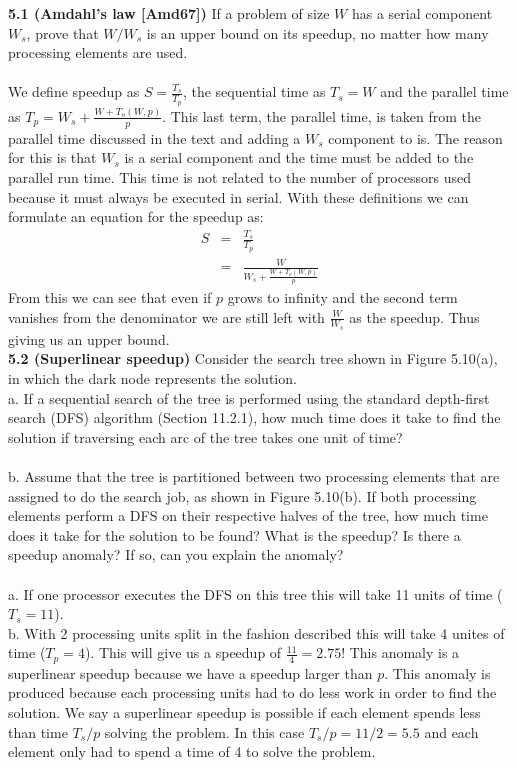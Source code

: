 \documentclass[11pt]{article}
\begin{document}
 {\bf 5.1 (Amdahl's law [Amd67])} If a problem of size $W$ has a serial
 component $W_s$, prove that $W/W_s$ is an upper bound on its speedup, no
 matter how many processing elements are used.\\\\
 We define speedup as $S = \frac{T_s}{T_p}$, the sequential time
 as $T_s = W$ and the parallel time as $T_p = W_s +
 \frac{W+T_o(W,p)}{p}$. This last term, the parallel time, is
 taken from the parallel time discussed in the text and adding a
 $W_s$ component to is. The reason for this is that $W_s$ is a
 serial component and the time must be added to the parallel
 run time. This time is not related to the number of processors
 used because it must always be executed in serial. With these
 definitions we can formulate an equation for the speedup as:
 $$ \begin{array}{lcc}
   S & = & \frac{T_s}{T_p}\\
   & = & \frac{W}{W_s + \frac{W+T_o(W,p)}{p}}
 \end{array} $$
 From this we can see that even if $p$ grows to infinity and the
 second term vanishes from the denominator we are still left with
 $\frac{W}{W_s}$ as the speedup. Thus giving us an upper bound.\\
 
 {\bf 5.2 (Superlinear speedup)} Consider the search tree shown in
 Figure 5.10(a), in which the dark node represents the solution.\\
 a. If a sequential search of the tree is performed using the
 standard depth-first search (DFS) algorithm (Section 11.2.1), how
 much time does it take to find the solution if traversing each
 arc of the tree takes one unit of time?\\\\
 b. Assume that the tree is partitioned between two processing
 elements that are assigned to do the search job, as shown in
 Figure 5.10(b). If both processing elements perform a DFS on
 their respective halves of the tree, how much time does it take
 for the solution to be found? What is the speedup? Is there a
 speedup anomaly? If so, can you explain the anomaly?\\\\
 a. If one processor executes the DFS on this tree this will take
 11 units of time ($T_s = 11$).\\
 b. With 2 processing units split in the fashion described this
 will take 4 unites of time ($T_p = 4$). This will give us a
 speedup of $\frac{11}{4} = 2.75$! This anomaly is a superlinear
 speedup because we have a speedup larger than $p$. This anomaly
 is produced because each processing units had to do less work in
 order to find the solution. We say a superlinear speedup is
 possible if each element spends less than time $T_s/p$ solving
 the problem. In this case $T_s/p = 11/2 = 5.5$ and each element
 only had to spend a time of 4 to solve the problem.\\
 
\end{document}
